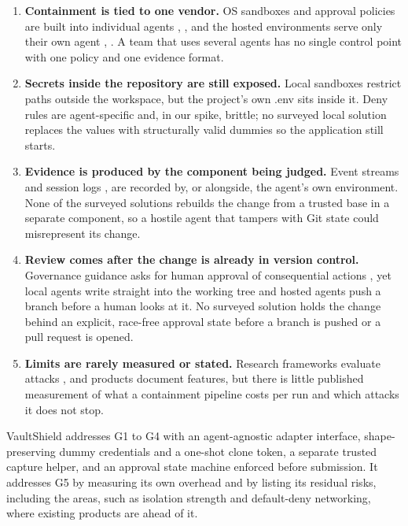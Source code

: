 \documentclass[12pt,a4paper,oneside]{report}
\providecommand{\tightlist}{\setlength{\itemsep}{0pt}\setlength{\parskip}{0pt}}
\begin{document}
\begin{enumerate}
\def\labelenumi{G\arabic{enumi}.}
\tightlist
\item
  \textbf{Containment is tied to one vendor.} OS sandboxes and approval policies are built into individual agents \cite{ref16}, \cite{ref18}, and the hosted environments serve only their own agent \cite{ref18}, \cite{ref19}. A team that uses several agents has no single control point with one policy and one evidence format.
\item
  \textbf{Secrets inside the repository are still exposed.} Local sandboxes restrict paths outside the workspace, but the project's own .env sits inside it. Deny rules are agent-specific and, in our spike, brittle; no surveyed local solution replaces the values with structurally valid dummies so the application still starts.
\item
  \textbf{Evidence is produced by the component being judged.} Event streams and session logs \cite{ref4}, \cite{ref10} are recorded by, or alongside, the agent's own environment. None of the surveyed solutions rebuilds the change from a trusted base in a separate component, so a hostile agent that tampers with Git state could misrepresent its change.
\item
  \textbf{Review comes after the change is already in version control.} Governance guidance asks for human approval of consequential actions \cite{ref9}, yet local agents write straight into the working tree and hosted agents push a branch before a human looks at it. No surveyed solution holds the change behind an explicit, race-free approval state before a branch is pushed or a pull request is opened.
\item
  \textbf{Limits are rarely measured or stated.} Research frameworks evaluate attacks \cite{ref5}, \cite{ref6} and products document features, but there is little published measurement of what a containment pipeline costs per run and which attacks it does not stop.
\end{enumerate}

VaultShield addresses G1 to G4 with an agent-agnostic adapter interface, shape-preserving dummy credentials and a one-shot clone token, a separate trusted capture helper, and an approval state machine enforced before submission. It addresses G5 by measuring its own overhead and by listing its residual risks, including the areas, such as isolation strength and default-deny networking, where existing products are ahead of it.

\clearpage
\end{document}
